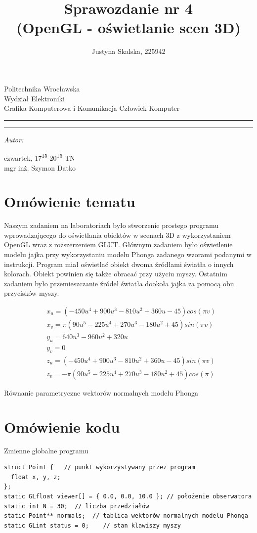 \documentclass[12pt,a4paper,titlepage]{article}
\author{Justyna Skalska, 225942}
\title{Sprawozdanie nr 4\\
(OpenGL - oświetlanie scen 3D)}
\makeatletter
\newcommand{\linia}{\rule{\linewidth}{0.4mm}}
\renewcommand{\maketitle}{\begin{titlepage}
    \vspace*{1cm}
    \begin{center}\small
    Politechnika Wrocławska\\
    Wydział Elektroniki\\
    Grafika Komputerowa i Komunikacja Człowiek-Komputer
    \end{center}
    \vspace{3cm}
    \noindent\linia
    \begin{center}
      \LARGE \textsc{\@title}
         \end{center}
     \linia
    \vspace{0.5cm}
    \begin{flushright}
    \begin{minipage}{7cm}
    \textit{\small Autor:}\\
    \normalsize \textsc{\@author} \par
    \end{minipage}
    \vspace{5cm}

     {\small czwartek, 17\textsuperscript{15}-20\textsuperscript{15} TN}\\
        mgr inż. Szymon Datko
     \end{flushright}
    \vspace*{\stretch{6}}
    \begin{center}
    \@date
    \end{center}
  \end{titlepage}%
}
\makeatother
\begin{document}
\maketitle
\section{Omówienie tematu}
Naszym zadaniem na laboratoriach było stworzenie prostego programu wprowadzającego do oświetlania obiektów w scenach 3D z wykorzystaniem OpenGL wraz z rozszerzeniem GLUT. Głównym zadaniem było oświetlenie modelu jajka przy wykorzystaniu modelu Phonga zadanego wzorami podanymi w instrukcji. Program miał oświetlać obiekt dwoma źródłami światła o innych kolorach. Obiekt powinien się także obracać przy użyciu myszy. Ostatnim zadaniem było przemieszczanie źródeł światła dookoła jajka za pomocą obu przycisków myszy.

\begin{myequation}[H]
\begin{equation}
    \begin{split}
    & x_{u} = (-450u^4 + 900u^3 - 810u^2 + 360u - 45)cos(\pi v) \\
    & x_{v} = \pi(90u^5 - 225u^4 + 270u^3 - 180u^2 + 45)sin(\pi v) \\
    & y_{u} = 640u^3 - 960u^2 + 320u \\
    & y_{v} = 0 \\
    & z_{u} = (-450u^4 + 900u^3 - 810u^2 + 360u - 45)sin(\pi v) \\
    & z_{v} = -\pi(90u^5 - 225u^4 + 270u^3 - 180u^2 + 45)cos(\pi)
    \end{split}
\end{equation}
\caption{Równanie parametryczne wektorów normalnych modelu Phonga}
\end{myequation}

\section{Omówienie kodu}

\begin{listing}[H]
\caption{Zmienne globalne programu}
\begin{verbatim}
struct Point {   // punkt wykorzystywany przez program
  float x, y, z;
};
static GLfloat viewer[] = { 0.0, 0.0, 10.0 }; // położenie obserwatora
static int N = 30;  // liczba przedziałów
static Point** normals;  // tablica wektorów normalnych modelu Phonga
static GLint status = 0;    // stan klawiszy myszy 
\end{verbatim}
\end{listing}
\end{document}
